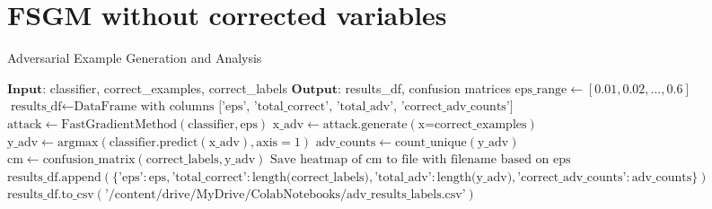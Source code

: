 \documentclass[11pt,onside]{article}
\begin{document}
\clearpage %

\section{FSGM without corrected variables}

\begin{algorithm}[H]
\caption{Adversarial Example Generation and Analysis}
\begin{algorithmic}[1]
\State $\textbf{Input:}$ classifier, correct\_examples, correct\_labels
\State $\textbf{Output:}$ results\_df, confusion matrices
\State $\text{eps\_range} \gets [0.01, 0.02, \ldots, 0.6]$
\State $\text{results\_df} \gets \text{DataFrame with columns ['eps', 'total\_correct', 'total\_adv', 'correct\_adv\_counts']}$
    \State $\text{attack} \gets \text{FastGradientMethod}(\text{classifier}, \text{eps})$
    \State $\text{x\_adv} \gets \text{attack.generate}(\text{x=correct\_examples})$
    \State $\text{y\_adv} \gets \text{argmax}(\text{classifier.predict}(\text{x\_adv}), \text{axis}=1)$
    \State $\text{adv\_counts} \gets \text{count\_unique}(\text{y\_adv})$
    \State $\text{cm} \gets \text{confusion\_matrix}(\text{correct\_labels}, \text{y\_adv})$
    \State $\text{Save heatmap of cm to file with filename based on eps}$
    \State $\text{results\_df.append}(\{\text{'eps'}: \text{eps}, \text{'total\_correct'}: \text{length(correct\_labels)}, \text{'total\_adv'}: \text{length(y\_adv)}, \text{'correct\_adv\_counts'}: \text{adv\_counts}\})$
\EndFor
\State $\text{results\_df.to\_csv}(\text{'/content/drive/MyDrive/ColabNotebooks/adv\_results\_labels.csv'})$
\end{algorithmic}
\end{algorithm}
\end{document}
